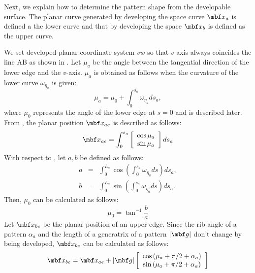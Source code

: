 \documentclass[E]{scitrans}
\begin{document}
Next, we explain how to determine the pattern shape from the developable surface. The planar curve generated by developing the space curve $ \mbold{x}_a $ is defined a the lower curve and that by developing the space $ \mbold{x}_b $ is defined as the upper curve.

We set developed planar coordinate system $ vw $ so that $ v $-axis always coincides the line AB as shown in . Let $ \mu_a $ be the angle between the tangential direction of the lower edge and the $ v $-axis. $ \mu_a $ is obtained as follows when the curvature of the lower curve $ \omega_{\eta_a} $  is given:
\begin{equation}\label{eq:mu_eq}
\mu_a = \mu_0 + \int_{0}^{s_a} \omega_{\eta_a} ds_a,
\end{equation}
where $ \mu_0 $ represents the angle of the lower edge at $ s=0 $ and is described later. From , the planar position $ \mbold{x}_{ae} $ is described as follows:
\begin{equation}\label{eq:x_LE}
\mbold{x}_{ae}  = \int_{0}^{s_a} \left[\begin{array}{cc} \cos \mu_a \\ \sin \mu_a \end{array}\right] ds_a
\end{equation}
With respect to , let $ a,b $ be defined as follows:
\begin{eqnarray}
a &=& \int_{0}^{L_a} \cos \left( \int_{0}^{s_a} \omega_{\eta_a} ds\right) ds_a, \\
b &=& \int_{0}^{L_a} \sin \left( \int_{0}^{s_a} \omega_{\eta_a} ds\right) ds_a. 
\end{eqnarray}
Then, $ \mu_0 $ can be calculated as follows:
\begin{equation}\label{eq:mu_0eq}
\mu_0 = \tan^{-1}\frac{b}{a}
\end{equation}
Let $ \mbold{x}_{be} $ be the planar position of an upper edge. Since the rib angle of a pattern $ \alpha_a $ and the length of a generatrix of a pattern $ |\mbold{g}| $ don't change by being developed, $ \mbold{x}_{be} $ can be calculated as follows:
\begin{equation}\label{eq:x_UE}
\mbold{x}_{be} = \mbold{x}_{ae} + |\mbold{g}| \left[\begin{array}{cc} \cos \left(\mu_a + \pi/2 + \alpha_a \right) \\ \sin \left(\mu_a + \pi/2 + \alpha_a \right)  \end{array}\right] 
\end{equation}
\end{document}
